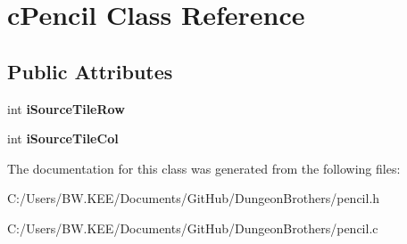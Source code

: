 \hypertarget{classc_pencil}{\section{c\-Pencil Class Reference}
\label{classc_pencil}
}
\subsection*{Public Attributes}
\begin{DoxyCompactItemize}
\item 
\hypertarget{classc_pencil_ae4e4dc8ff114ca11ff1763b56755ff2b}{int {\bfseries i\-Source\-Tile\-Row}}\label{classc_pencil_ae4e4dc8ff114ca11ff1763b56755ff2b}

\item 
\hypertarget{classc_pencil_acb8fb1c96a11eaeb2f48f4d79d1dba13}{int {\bfseries i\-Source\-Tile\-Col}}\label{classc_pencil_acb8fb1c96a11eaeb2f48f4d79d1dba13}

\end{DoxyCompactItemize}


The documentation for this class was generated from the following files\-:\begin{DoxyCompactItemize}
\item 
C\-:/\-Users/\-B\-W.\-K\-E\-E/\-Documents/\-Git\-Hub/\-Dungeon\-Brothers/pencil.\-h\item 
C\-:/\-Users/\-B\-W.\-K\-E\-E/\-Documents/\-Git\-Hub/\-Dungeon\-Brothers/pencil.\-c\end{DoxyCompactItemize}
